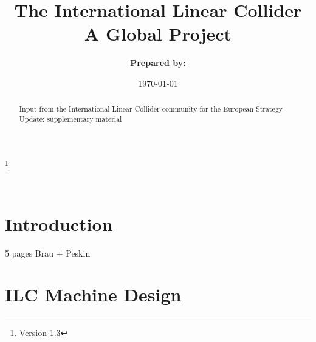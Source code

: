 \documentclass[%
 reprint,
nofootinbib,
 amsmath,amssymb,
 aps,
]{revtex4-1}
\begin{document}

\title{The International Linear Collider \\ A Global Project}%
\thanks{Version 1.3}%

\author{\textbf{Prepared by:}
 }
\affiliation{\vspace{.2 cm} }

%


\date{\today}%

\begin{abstract}
Input from the International Linear Collider community for the European Strategy Update: supplementary material

\end{abstract}

\maketitle

\tableofcontents

\clearpage
\newpage
\mbox{~}


\section{\label{sec:intro}Introduction}
   5 pages Brau + Peskin
   
   

   
\section{\label{sec:ilc}ILC Machine Design}
\end{document}
